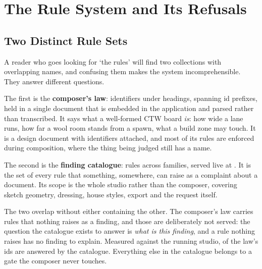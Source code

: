 \chapter{The Rule System and Its Refusals}
\label{ch:refusals}

\section{Two Distinct Rule Sets}

A reader who goes looking for `the rules' will find two collections with
overlapping names, and confusing them makes the system incomprehensible. They
answer different questions.

The first is the \textbf{composer's law}: \LawRuleCount{} identifiers under
\LawFamilyCount{} headings, spanning \LawIdPrefixCount{} id prefixes, held in a
single document that is embedded in the application and parsed rather than
transcribed. It says what a well-formed CTW board \emph{is}: how wide a lane runs,
how far a wool room stands from a spawn, what a build zone may touch. It is
a design document with identifiers attached, and most of its rules are enforced
during composition, where the thing being judged still has a name.

The second is the \textbf{finding catalogue}: \RuleCount{} rules across
\RuleFamilyCount{} families, served live at . It is the set of every rule that something,
somewhere, can raise as a complaint about a document. Its scope is the whole
studio rather than the composer, covering sketch geometry, dressing, house styles,
export and the request itself.

The two overlap without either containing the other. The composer's law carries
rules that nothing raises as a finding, and those are deliberately not served: the
question the catalogue exists to answer is \emph{what is this finding}, and a rule
nothing raises has no finding to explain. Measured against the running studio,
\LawServedCount{} of the law's \LawRuleCount{} ids are answered by the catalogue.
Everything else in the catalogue belongs to a gate the composer never touches.

\begin{table}[htbp]
\caption{The finding catalogue by family, generated from the running studio. A
family is the field the API answers with, not the id's prefix: the four
build-zone rules are numbered  and belong to family , so
\RuleIdPrefixCount{} prefixes span \RuleFamilyCount{} families.}
\label{tab:families-live}
\scriptsize

\end{table}


